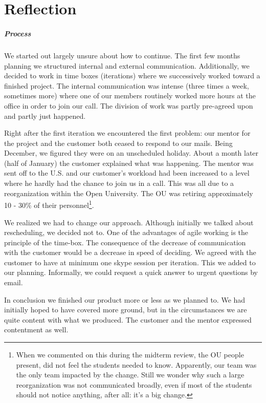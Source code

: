 \chapter{Reflection}
\paragraph{Process} We started out largely unsure about how to continue. The first few months
planning we structured internal and external communication. Additionally, we decided to 
work in time boxes (iterations) where we successively worked toward a finished project. 
The internal communication was intense (three times a week, sometimes more) where one of our
members routinely worked more hours at the office in order to join our call. The division of work 
was partly pre-agreed upon and partly just happened.

Right after the first iteration we encountered the first problem: our mentor for the project 
and the customer both ceased to respond to our mails. Being December, we figured they were 
on an unscheduled holiday. About a month later (half of January) the customer explained 
what was happening. The mentor was sent off to the U.S. and our customer's workload had been 
increased to a level where he hardly had the chance to join us in a call. This was all due to 
a reorganization within the Open University. The OU was retiring approximately 10 - 30\% of their
personnel\footnote{When we commented on this during the midterm review, the OU people present,
did not feel the students needed to know. Apparently, our team was the only team impacted 
by the change. Still we wonder why such a large reorganization was not communicated broadly, 
even if most of the students should not notice anything, after all: it's a big change.}.
 
We realized we had to change our approach. Although initially we talked about rescheduling,
we decided not to. One of the advantages of agile working is the principle of the time-box. 
The consequence of the decrease of communication with the customer would be a decrease in speed
of deciding. We agreed with the customer to have at minimum one skype session per iteration. 
This we added to our planning. Informally, we could request a quick answer to urgent questions
by email.

In conclusion we finished our product more or less as we planned to. We had initially
hoped to have covered more ground, but in the circumstances we are quite content with what 
we produced. The customer and the mentor expressed contentment as well.

